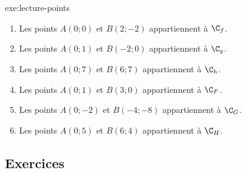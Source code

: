 {	%
}{exe:lecture-points}{
	\begin{enumerate}
		\item[$f$:] 
			Les points $A(0;0)$ et $B(2;-2)$ appartiennent à $\C_f$.
		\item[$g$:] 
			Les points $A(0;1)$ et $B(-2;0)$ appartiennent à $\C_g$.
		\item[$h$:] 
			Les points $A(0;7)$ et $B(6;7)$ appartiennent à $\C_h$.
		\item[$F$:] 
			Les points $A(0;1)$ et $B(3;0)$ appartiennent à $\C_F$.
		\item[$G$:] 
			Les points $A(0;-2)$ et $B(-4;-8)$ appartiennent à $\C_G$.
		\item[$H$:] 
			Les points $A(0;5)$ et $B(6;4)$ appartiennent à $\C_H$.
	\end{enumerate}
}

\subsection*{Exercices}


